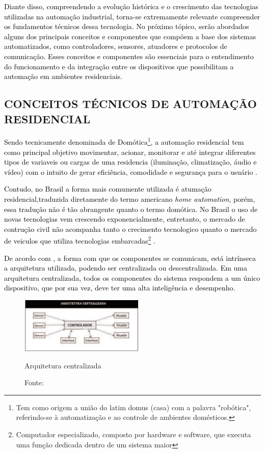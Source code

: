         \textcolor{black}{Diante disso, compreendendo a evolução histórica e o crescimento das tecnologias utilizadas na automação industrial, torna-se extremamente relevante compreender os fundamentos técnicos dessa tecnologia. No próximo tópico, serão abordados alguns dos principais conceitos e componentes que compõem a base dos sistemas automatizados, como controladores, sensores, atuadores e protocolos de comunicação. Esses conceitos e componentes são essenciais para o entendimento do funcionamento e da integração entre os dispositivos que possibilitam a automação em ambientes residenciais.}


    \subsection{CONCEITOS TÉCNICOS DE AUTOMAÇÃO RESIDENCIAL}
    
       \textcolor{black}{Sendo tecnicamente denominada de Domótica\footnote{Tem como origem a união do latim domus (casa) com a palavra "robótica", referindo-se à automatização e ao controle de ambientes domésticos.}, a automação residencial tem como principal objetivo movimentar, acionar, monitorar e até integrar diferentes tipos de variaveis ou cargas de uma residencia (iluminação, climatização, áudio e vídeo) com o intuito de gerar eficiência, comodidade e segurança para o usuário \cite{oliveira2019domotica}.}

       \textcolor{black}{Contudo, no Brasil a forma mais comumente utilizada é atumação residencial,traduzida diretamente do termo americano \textit{home automation}, porém, essa tradução não é tão abrangente quanto o termo domótica. No Brasil o uso de novas tecnologias vem crescendo exponencialmente, entretanto, o mercado de contrução civil não acompanha tanto o crecimento tecnologico quanto o mercado de veiculos que utiliza tecnologias embarcadas\footnote{Computador especializado, composto por hardware e software, que executa uma função dedicada dentro de um sistema maior} \cite{hipolito2018automaccao}.}

       \textcolor{black}{De acordo com \cite{accardi2012automaccao}, a forma com que os componentes se comunicam, está intrínseca a arquitetura utilizada, podendo ser centralizada ou descentralizada. Em uma arquitetura centralizada, todos os componentes do sistema respondem a um único dispositivo, que por sua vez, deve ter uma alta inteligência e desempenho.}

        \begin{figure}[H]
                \centering
                \caption{ }  
                \centering
                \label{fig:cont}
                \includegraphics[width=0.53\textwidth]{imagens/arquiteturaCentralizada.png}
                \caption*{Arquitetura centralizada}
                \caption*{Fonte: \cite{hipolito2018automaccao}}
        \end{figure}

